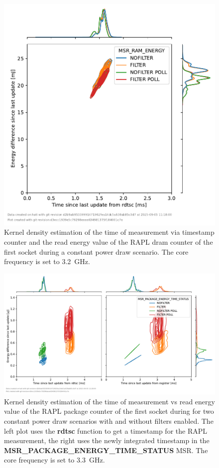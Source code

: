 \begin{figure}[]
    \centering
    \includegraphics[width=0.54\columnwidth]{fig/rapl-update-intervals/MSR_RAM_ENERGY_3200000.pdf}
    \caption{Kernel density estimation of the time of measurement via timestamp counter and the read energy value of the RAPL dram counter of the first socket during a constant power draw scenario.
    The core frequency is set to \SI{3.2}{\GHz}.}
\end{figure}

\clearpage
\begin{figure}[]
    \centering
    \includegraphics[width=\columnwidth]{fig/rapl-update-intervals/MSR_PACKAGE_ENERGY_TIME_STATUS_3300000.pdf}
    \caption{Kernel density estimation of the time of measurement vs read energy value of the RAPL package counter of the first socket during for two constant power draw scenarios with and without filters enabled.
    The left plot uses the \textbf{rdtsc} function to get a timestamp for the RAPL measurement, the right uses the newly integrated timestamp in the \textbf{MSR\_PACKAGE\_ENERGY\_TIME\_STATUS} MSR.
    The core frequency is set to \SI{3.3}{\GHz}.}
\end{figure}

